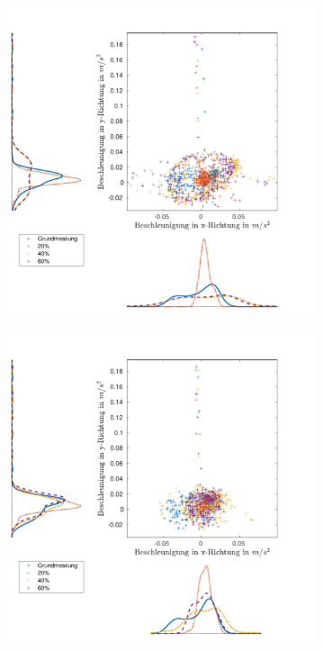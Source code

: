 \begin{figure}[htb]
	\centering
	\begin{adjustwidth}{-0.2\linewidth}{-0.2\linewidth}
		\hspace{+45pt}
		\begin{subfigure}[c]{.45\linewidth}
			\centering
			\includegraphics[width=\linewidth]{Bilder/Beschleunigung_Grund_20_40_60_ohneM.pdf}
			\vspace{5pt}
		\end{subfigure}
		\hspace{-25pt}
		\begin{subfigure}[c]{.45\linewidth}
			\centering
			\includegraphics[width=\linewidth]{Bilder/Beschleunigung_Grund_20_40_60_mitM.pdf}

\end{subfigure}
\end{adjustwidth}
\end{figure}

